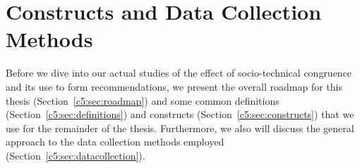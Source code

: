 \section{Constructs and Data Collection Methods}
\label{chap:meth}
Before we dive into our actual studies of the effect of socio-technical congruence and its use to form recommendations, we present the overall roadmap for this thesis (Section~\ref{c5:sec:roadmap}) and some common definitions (Section~\ref{c5:sec:definitions}) and constructs (Section~\ref{c5:sec:constructs}) that we use for the remainder of the thesis.
Furthermore, we also will discuss the general approach to the data collection methods employed (Section~\ref{c5:sec:datacollection}).


